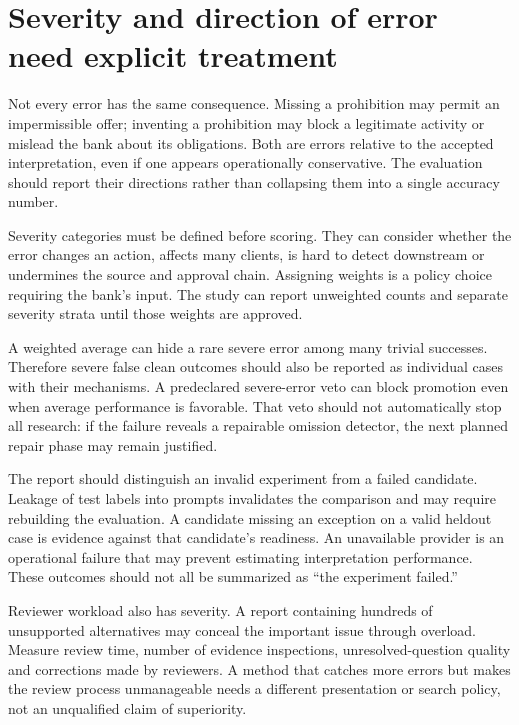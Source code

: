 \section{Severity and direction of error need explicit treatment}
\label{merge:M09:06}


Not every error has the same consequence. Missing a prohibition may permit an
impermissible offer; inventing a prohibition may block a legitimate activity or
mislead the bank about its obligations. Both are errors relative to the accepted
interpretation, even if one appears operationally conservative. The evaluation
should report their directions rather than collapsing them into a single accuracy
number.

Severity categories must be defined before scoring. They can consider whether the
error changes an action, affects many clients, is hard to detect downstream or
undermines the source and approval chain. Assigning weights is a policy choice
requiring the bank's input. The study can report unweighted counts and separate
severity strata until those weights are approved.


A weighted average can hide a rare severe error among many trivial successes.
Therefore severe false clean outcomes should also be reported as individual cases
with their mechanisms. A predeclared severe-error veto can block promotion even
when average performance is favorable. That veto should not automatically stop
all research: if the failure reveals a repairable omission detector, the next
planned repair phase may remain justified.

The report should distinguish an invalid experiment from a failed candidate.
Leakage of test labels into prompts invalidates the comparison and may require
rebuilding the evaluation. A candidate missing an exception on a valid heldout
case is evidence against that candidate's readiness. An unavailable provider is
an operational failure that may prevent estimating interpretation performance.
These outcomes should not all be summarized as ``the experiment failed.''

Reviewer workload also has severity. A report containing hundreds of unsupported
alternatives may conceal the important issue through overload. Measure review
time, number of evidence inspections, unresolved-question quality and corrections
made by reviewers. A method that catches more errors but makes the review process
unmanageable needs a different presentation or search policy, not an unqualified
claim of superiority.

